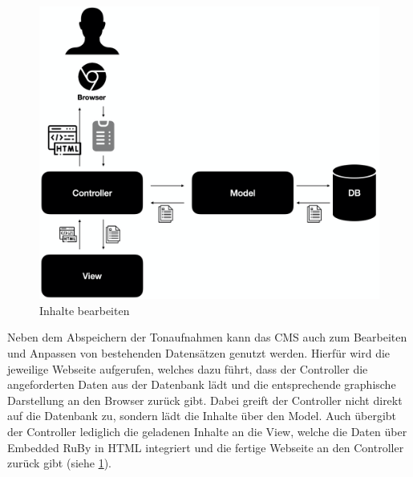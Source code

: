 \begin{figure}
	\centering
	\includegraphics[width=0.5\linewidth]{Assets/PluraPolit-Softwaresystem.004}
	\caption{Inhalte bearbeiten}
	\label{fig:plurapolit-edit}
\end{figure}

Neben dem Abspeichern der Tonaufnahmen kann das CMS auch zum Bearbeiten und Anpassen von bestehenden Datensätzen genutzt werden. Hierfür wird die jeweilige Webseite aufgerufen, welches dazu führt, dass der Controller die angeforderten Daten aus der Datenbank lädt und die entsprechende graphische Darstellung an den Browser zurück gibt. Dabei greift der Controller nicht direkt auf die Datenbank zu, sondern lädt die Inhalte über den Model.
Auch übergibt der Controller lediglich die geladenen Inhalte an die View, welche  die Daten über Embedded RuBy in HTML integriert und die fertige Webseite  an den Controller zurück gibt (siehe \cref{fig:plurapolit-edit}).

